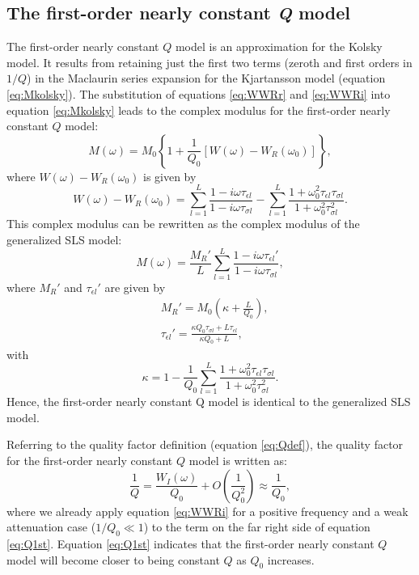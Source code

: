 \documentclass[article]{./macros/elsarticle_qh}
\begin{document}
\subsection{The first-order nearly constant \textit{Q} model}
The first-order nearly constant $Q$ model is an approximation for the Kolsky model. It results from retaining just the first two terms (zeroth and first orders in $1/Q$) in the Maclaurin series expansion for the Kjartansson model (equation \ref{eq:Mkolsky}). The substitution of equations \ref{eq:WWRr} and \ref{eq:WWRi} into equation \ref{eq:Mkolsky} leads to the complex modulus for the first-order nearly constant $Q$ model:
\begin{equation} \label{eq:M1st}
M(\omega) = M_{0} \left \{
1 + \frac{1}{Q_{0}} \left[W(\omega) - W_{R}(\omega_{0}) \right] 
\right \} ,
\end{equation}
where $W(\omega) - W_{R}(\omega_{0})$ is given by
\begin{equation} \label{eq:W_Wr}
W(\omega) - W_{R}(\omega_{0})
= \sum_{l=1}^{L} \frac{1-i\omega\tau_{\epsilon l}}{1-i\omega\tau_{\sigma l}}
-
\sum_{l=1}^{L}
\frac{1 + \omega_{0}^2 \tau_{\epsilon l}\tau_{\sigma l}}
{1+\omega_{0}^2 \tau_{\sigma l}^2} .
\end{equation}
This complex modulus can be rewritten as the complex modulus of the generalized SLS model:
\begin{equation} \label{eq:Mgsls}
M(\omega) = \frac{M_{R}'}{L} \sum_{l=1}^{L} \frac{1-i\omega\tau_{\epsilon l}'}{1-i\omega\tau_{\sigma l}} ,
\end{equation}
where $M_{R}'$ and $\tau_{\epsilon l}'$ are given by
\begin{align}
& M_{R}' = M_{0} \left(\kappa + \frac{L}{Q_{0}} \right) , \\
& \tau_{\epsilon l}' = \frac{\kappa Q_{0} \tau_{\sigma l} + L\tau_{\epsilon l}}{\kappa Q_{0} + L} ,
\end{align}
with
\begin{equation}
\kappa = 1 - \frac{1}{Q_{0}} 
\sum_{l=1}^{L}
\frac{1 + \omega_{0}^2 \tau_{\epsilon l}\tau_{\sigma l}}
{1+\omega_{0}^2 \tau_{\sigma l}^2} .
\end{equation}
Hence, the first-order nearly constant Q model is identical to the generalized SLS model.

Referring to the quality factor definition (equation \ref{eq:Qdef}), the quality factor for the first-order nearly constant $Q$ model is written as:
\begin{equation} \label{eq:Q1st}
\frac{1}{Q} = \frac{W_{I}(\omega)}{Q_{0}} + O(\frac{1}{Q_{0}^2})
\approx \frac{1}{Q_{0}} ,  
\end{equation}
where we already apply equation \ref{eq:WWRi} for a positive frequency and a weak attenuation case ($1/Q_{0} \ll 1$) to the term on the far right side of equation \ref{eq:Q1st}. Equation \ref{eq:Q1st} indicates that the first-order nearly constant $Q$ model will become closer to being constant $Q$ as $Q_{0}$ increases. 
\end{document}
